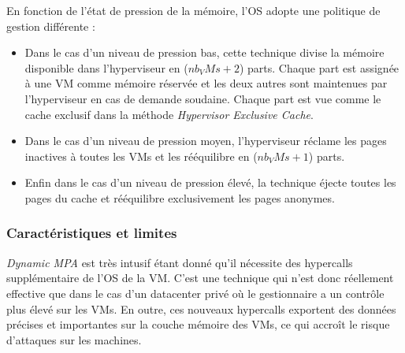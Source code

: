 \noindent En fonction de l'état de pression de la mémoire, l'OS adopte une politique de gestion différente : 
\begin{itemize}
    \item Dans le cas d'un niveau de pression bas, cette technique divise la mémoire disponible dans l'hyperviseur en ($nb_VMs + 2$) parts. Chaque part est assignée à une VM comme mémoire réservée et les deux autres sont maintenues par l'hyperviseur en cas de demande soudaine. Chaque part est vue comme le cache exclusif dans la méthode \textit{Hypervisor Exclusive Cache}.
    \item Dans le cas d'un niveau de pression moyen, l'hyperviseur réclame les pages inactives à toutes les VMs et les rééquilibre en ($nb_VMs + 1$) parts.
    \item Enfin dans le cas d'un niveau de pression élevé, la technique éjecte toutes les pages du cache et rééquilibre exclusivement les pages anonymes.
\end{itemize}

\subsubsection{Caractéristiques et limites}
\textit{Dynamic MPA} est très intusif étant donné qu'il nécessite des hypercalls supplémentaire de l'OS de la VM. C'est une technique qui n'est donc réellement effective que dans le cas d'un datacenter privé où le gestionnaire a un contrôle plus élevé sur les VMs. En outre, ces nouveaux hypercalls exportent des données précises et importantes sur la couche mémoire des VMs, ce qui accroît le risque d'attaques sur les machines.